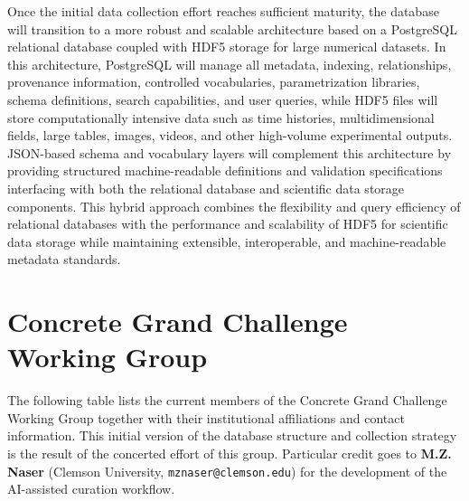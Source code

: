 \documentclass[11pt]{book}
\begin{document}
Once the initial data collection effort reaches sufficient maturity, the database will transition to a more robust and scalable architecture based on a PostgreSQL relational database coupled with HDF5 storage for large numerical datasets. In this architecture, PostgreSQL will manage all metadata, indexing, relationships, provenance information, controlled vocabularies, parametrization libraries, schema definitions, search capabilities, and user queries, while HDF5 files will store computationally intensive data such as time histories, multidimensional fields, large tables, images, videos, and other high-volume experimental outputs. JSON-based schema and vocabulary layers will complement this architecture by providing structured machine-readable definitions and validation specifications interfacing with both the relational database and scientific data storage components. This hybrid approach combines the flexibility and query efficiency of relational databases with the performance and scalability of HDF5 for scientific data storage while maintaining extensible, interoperable, and machine-readable metadata standards.

\footnotesize
\section{Concrete Grand Challenge Working Group}

The following table lists the current members of the Concrete Grand Challenge Working Group together with their institutional affiliations and contact information. This initial version of the database structure and collection strategy is the result of the concerted effort of this group. Particular credit goes to \textbf{M.Z. Naser} (Clemson University, \texttt{mznaser@clemson.edu}) for the development of the AI-assisted curation workflow.
\end{document}
